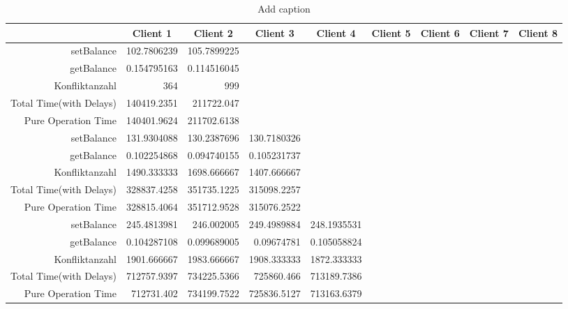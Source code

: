 \begin{landscape}
\begin{table}[htbp]
\scriptsize
  \centering
  \caption{Add caption}
    \begin{tabular}{rrrrrrrrr}
    \toprule
          & \multicolumn{1}{c}{Client 1} & \multicolumn{1}{c}{Client 2} & \multicolumn{1}{c}{Client 3} & \multicolumn{1}{c}{Client 4} & \multicolumn{1}{c}{Client 5} & \multicolumn{1}{c}{Client 6} & \multicolumn{1}{c}{Client 7} & \multicolumn{1}{c}{Client 8} \\
    \midrule
    setBalance & 102.7806239 & 105.7899225 &       &       &       &       &       &  \\
    getBalance & 0.154795163 & 0.114516045 &       &       &       &       &       &  \\
    Konfliktanzahl & 364   & 999   &       &       &       &       &       &  \\
    Total Time(with Delays) & 140419.2351 & 211722.047 &       &       &       &       &       &  \\
    Pure Operation Time & 140401.9624 & 211702.6138 &       &       &       &       &       &  \\
\cline{1-9}     
    setBalance & 131.9304088 & 130.2387696 & 130.7180326 &       &       &       &       &  \\
    getBalance & 0.102254868 & 0.094740155 & 0.105231737 &       &       &       &       &  \\
    Konfliktanzahl & 1490.333333 & 1698.666667 & 1407.666667 &       &       &       &       &  \\
    Total Time(with Delays) & 328837.4258 & 351735.1225 & 315098.2257 &       &       &       &       &  \\
    Pure Operation Time & 328815.4064 & 351712.9528 & 315076.2522 &       &       &       &       &  \\
\cline{1-9}     
    setBalance & 245.4813981 & 246.002005 & 249.4989884 & 248.1935531 &       &       &       &  \\
    getBalance & 0.104287108 & 0.099689005 & 0.09674781 & 0.105058824 &       &       &       &  \\
    Konfliktanzahl & 1901.666667 & 1983.666667 & 1908.333333 & 1872.333333 &       &       &       &  \\
    Total Time(with Delays) & 712757.9397 & 734225.5366 & 725860.466 & 713189.7386 &       &       &       &  \\
    Pure Operation Time & 712731.402 & 734199.7522 & 725836.5127 & 713163.6379 &       &       &       &  \\    

\end{tabular}
\end{table}
\end{landscape}
